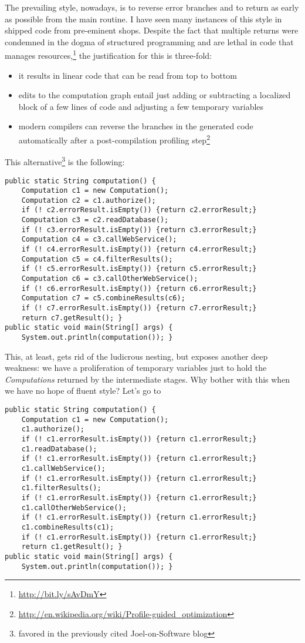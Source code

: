 \documentclass[11pt]{article}
\begin{document}
The prevailing style, nowadays, is to reverse error branches and to
return as early as possible from the main routine. I have seen many
instances of this style in shipped code from pre-eminent shops.
Despite the fact that multiple returns were condemned in the dogma
of structured programming and are lethal in code that manages
resources,\footnote{\url{http://bit.ly/sAvDmY}} the justification for this is
three-fold:
\begin{itemize}
\item it results in linear code that can be read from top to bottom
\item edits to the computation graph entail just adding or subtracting
a localized block of a few lines of code and adjusting a few
temporary variables
\item modern compilers can reverse the branches in the generated code
automatically after a post-compilation profiling
step\footnote{\url{http://en.wikipedia.org/wiki/Profile-guided_optimization}}
\end{itemize}

This alternative\footnote{favored in the previously cited
   Joel-on-Software blog} is the following:

\begin{verbatim}
public static String computation() {
    Computation c1 = new Computation();
    Computation c2 = c1.authorize();
    if (! c2.errorResult.isEmpty()) {return c2.errorResult;}
    Computation c3 = c2.readDatabase();
    if (! c3.errorResult.isEmpty()) {return c3.errorResult;}
    Computation c4 = c3.callWebService();
    if (! c4.errorResult.isEmpty()) {return c4.errorResult;}
    Computation c5 = c4.filterResults();
    if (! c5.errorResult.isEmpty()) {return c5.errorResult;}
    Computation c6 = c3.callOtherWebService();
    if (! c6.errorResult.isEmpty()) {return c6.errorResult;}
    Computation c7 = c5.combineResults(c6);
    if (! c7.errorResult.isEmpty()) {return c7.errorResult;}
    return c7.getResult(); }
public static void main(String[] args) {
    System.out.println(computation()); }
\end{verbatim}

This, at least, gets rid of the ludicrous nesting, but exposes another
deep weakness: we have a proliferation of temporary variables just to
hold the \emph{Computations} returned by the intermediate stages. Why
bother with this when we have no hope of fluent style? Let's go to

\begin{verbatim}
public static String computation() {
    Computation c1 = new Computation();
    c1.authorize();
    if (! c1.errorResult.isEmpty()) {return c1.errorResult;}
    c1.readDatabase();
    if (! c1.errorResult.isEmpty()) {return c1.errorResult;}
    c1.callWebService();
    if (! c1.errorResult.isEmpty()) {return c1.errorResult;}
    c1.filterResults();
    if (! c1.errorResult.isEmpty()) {return c1.errorResult;}
    c1.callOtherWebService();
    if (! c1.errorResult.isEmpty()) {return c1.errorResult;}
    c1.combineResults(c1);
    if (! c1.errorResult.isEmpty()) {return c1.errorResult;}
    return c1.getResult(); }
public static void main(String[] args) {
    System.out.println(computation()); }
\end{verbatim}
\end{document}
